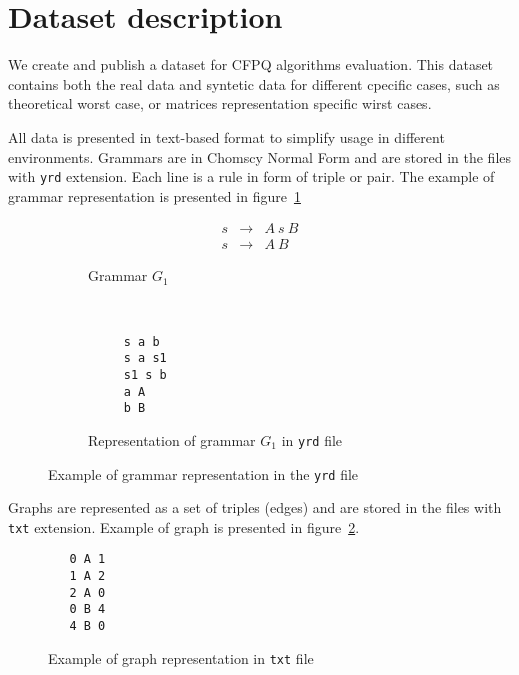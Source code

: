 \section{Dataset description}

We create and publish a dataset for CFPQ algorithms evaluation.
This dataset contains both the real data and syntetic data for different cpecific cases, such as theoretical worst case, or matrices representation specific wirst cases.

All data is presented in text-based format to simplify usage in different environments.
Grammars are in Chomscy Normal Form and are stored in the files with \verb|yrd| extension.
Each line is a rule in form of triple or pair. 
The example of grammar representation is presented in figure~\ref{fig:grammar_example}


\begin{figure}[h]
    \centering
    \begin{subfigure}[b]{0.24\textwidth}
        \centering
        \[
         \begin{array}{rcl}
           s & \rightarrow & A \ s \ B \\
           s & \rightarrow & A \ B 
         \end{array}        
         \]
        \caption{Grammar $G_1$}
    \end{subfigure}%
    ~ 
    \begin{subfigure}[b]{0.24\textwidth}
        \centering
        \begin{verbatim}
     s a b
     s a s1
     s1 s b
     a A
     b B
        \end{verbatim}
        \caption{Representation of grammar $G_1$ in \texttt{yrd} file}
    \end{subfigure}
    \caption{Example of grammar representation in the \texttt{yrd} file}
    \label{fig:grammar_example}
\end{figure}



Graphs are represented as a set of triples (edges) and are stored in the files with \verb|txt| extension. 
Example of graph is presented in figure~\ref{fig:graph_example}.

\begin{figure}[h]
 \begin{verbatim}
   0 A 1
   1 A 2
   2 A 0
   0 B 4
   4 B 0
 \end{verbatim} 
 \caption{Example of graph representation in \texttt{txt} file}
 \label{fig:graph_example}
\end{figure}

